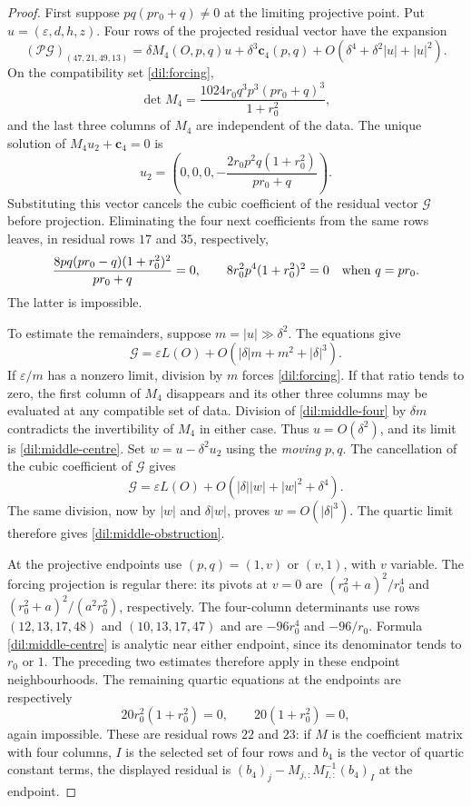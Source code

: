 \documentclass[11pt,a4paper]{article}
\numberwithin{equation}{section}
\theoremstyle{plain}
\theoremstyle{definition}
\theoremstyle{remark}
\begin{document}
\begin{proof}
First suppose $pq(pr_0+q)\ne0$ at the limiting projective point.
Put $u=(\varepsilon,d,h,z)$. Four rows of the projected residual vector
have the expansion
\begin{equation}\label{dil:middle-four}
 (\mathcal P\boldsymbol{\mathcal G})_{(47,21,49,13)}=\delta M_4(O,p,q)u+\delta^3\boldsymbol c_4(p,q)
           +O(\delta^4+\delta^2|u|+|u|^2).
\end{equation}
On the compatibility set \eqref{dil:forcing},
\[
 \det M_4=\frac{1024r_0q^3p^3(pr_0+q)^3}{1+r_0^2},
\]
and the last three columns of $M_4$ are independent of the data.  The
unique solution of $M_4u_2+\boldsymbol c_4=0$ is
\begin{equation}\label{dil:middle-centre}
 u_2=\left(0,0,0,-\frac{2r_0p^2q(1+r_0^2)}{pr_0+q}\right).
\end{equation}
Substituting this vector cancels the cubic coefficient of the
residual vector $\boldsymbol{\mathcal G}$ before projection. Eliminating the four
next coefficients from the same rows leaves, in residual rows
$17$ and $35$, respectively,
\begin{equation}\label{dil:middle-obstruction}
 \frac{8pq(pr_0-q)(1+r_0^2)^2}{pr_0+q}=0,\qquad
 8r_0^2p^4(1+r_0^2)^2=0\quad\hbox{when }q=pr_0.
\end{equation}
The latter is impossible.

To estimate the remainders, suppose $m=|u|\gg\delta^2$. The equations give
\[
 \boldsymbol{\mathcal G}=\varepsilon L(O)
                     +O(|\delta|m+m^2+|\delta|^3).
\]
If $\varepsilon/m$ has a nonzero limit, division by $m$ forces
\eqref{dil:forcing}.  If that ratio tends to zero, the first column of
 $M_4$ disappears and its other three columns may be evaluated at any
compatible set of data.  Division of \eqref{dil:middle-four} by
$\delta m$ contradicts the invertibility of $M_4$ in either case.
Thus $u=O(\delta^2)$, and its limit is
\eqref{dil:middle-centre}.  Set $w=u-\delta^2u_2$ using the
\emph{moving} $p,q$.  The cancellation of the cubic coefficient of $\boldsymbol{\mathcal G}$ gives
\[
 \boldsymbol{\mathcal G}=\varepsilon L(O)+O(|\delta||w|+|w|^2+\delta^4).
\]
The same division, now by $|w|$ and $\delta|w|$, proves
$w=O(|\delta|^3)$.  The quartic limit therefore gives \eqref{dil:middle-obstruction}.

At the projective endpoints use $(p,q)=(1,v)$ or $(v,1)$, with $v$ variable.  The forcing projection is regular there:
its pivots at $v=0$ are $(r_0^2+a)^2/r_0^4$ and
$(r_0^2+a)^2/(a^2r_0^2)$, respectively.  The four-column determinants
use rows $(12,13,17,48)$ and $(10,13,17,47)$ and are
$-96r_0^4$ and $-96/r_0$.  Formula
\eqref{dil:middle-centre} is analytic near either endpoint, since its
denominator tends to $r_0$ or $1$.  The preceding two estimates therefore apply in these endpoint neighbourhoods.  The remaining quartic equations
at the endpoints are respectively
\[
                   20r_0^2(1+r_0^2)=0,\qquad
                   20(1+r_0^2)=0,
\]
again impossible.  These are residual rows $22$ and $23$:
if $M$ is the coefficient matrix with four columns, $I$ is the
selected set of four rows and $b_4$ is the vector of quartic constant terms,
the displayed residual is
$(b_4)_j-M_{j,:}M_{I,:}^{-1}(b_4)_I$ at the endpoint.


\end{proof}
\end{document}
